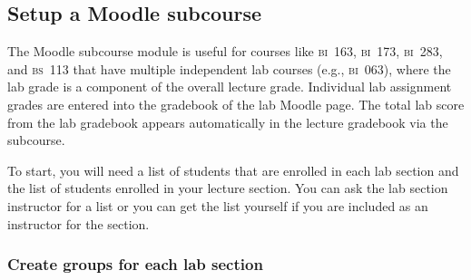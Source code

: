 \documentclass[12pt]{article}
\begin{document}
\subsection*{Setup a Moodle subcourse}

The Moodle subcourse module is useful for courses like \textsc{bi}~163, \textsc{bi}~173, \textsc{bi}~283, and \textsc{bs}~113 that have multiple independent lab courses (e.g., \textsc{bi}~063), where the lab grade is a component of the overall lecture grade. Individual lab assignment grades are entered into the gradebook of the lab Moodle page. The total lab score from the lab gradebook appears automatically in the lecture gradebook via the subcourse.

To start, you will need a list of students that are enrolled in each lab section and the list of students enrolled in your lecture section. You can ask the lab section instructor for a list or you can get the list yourself if you are included as an instructor for the section. 

\subsubsection*{Create groups for each lab section}
\end{document}

